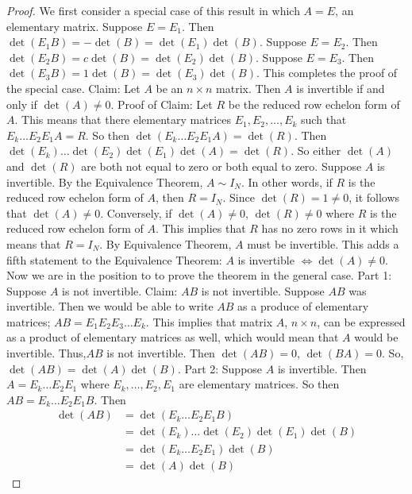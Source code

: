 \documentclass[12pt]{article}
\begin{document}
 \begin{proof} We first consider a special case of this result in which $A = E$, an elementary matrix. Suppose $E = E_1$. Then $\det(E_1B) = -\det(B) = \det(E_1)\det(B)$. Suppose $E = E_2$. Then $\det(E_2B) = c\det(B) = \det(E_2)\det(B)$. Suppose $E = E_3$. Then $\det(E_3B) = 1\det(B) = \det(E_3)\det(B)$. This completes the proof of the special case. \newline Claim: Let $A$ be an $n \times n$ matrix. Then $A$ is invertible if and only if $\det(A) \neq 0$. \newline Proof of Claim: Let $R$ be the reduced row echelon form of $A$. This means that there elementary matrices $E_1, E_2, \dots, E_k$ such that $E_k\dots E_2E_1A = R$. So then $\det(E_k \dots E_2E_1A) = \det(R)$. Then $\det(E_k)\dots \det(E_2)\det(E_1)\det(A) = \det(R)$. So either $\det(A)$ and $\det(R)$ are both not equal to zero or both equal to zero. Suppose $A$ is invertible. By the Equivalence Theorem, $A \sim I_N$. In other words, if $R$ is the reduced row echelon form of $A$, then $R = I_N$. Since $\det(R) = 1 \neq 0$, it follows that $\det(A) \neq 0$. \newline Conversely, if $\det(A) \neq 0$, $\det(R) \neq 0$ where $R$ is the reduced row echelon form of $A$. This implies that $R$ has no zero rows in it which means that $R = I_N$. By Equivalence Theorem, $A$ must be invertible. This adds a fifth statement to the Equivalence Theorem: $A$ is invertible $\iff \det(A) \neq 0$. Now we are in the position to to prove the theorem in the general case. \newline Part 1: Suppose $A$ is not invertible. \newline Claim: $AB$ is not invertible. \newline Suppose $AB$ was invertible. Then we would be able to write $AB$ as a produce of elementary matrices; $AB = E_1E_2E_3\dots E_k$. This implies that matrix $A$, $n \times n$, can be expressed as a product of elementary matrices as well, which would mean that $A$ would be invertible. Thus,$AB$ is not invertible. Then $\det(AB) = 0$, $\det(BA) = 0$. So, $\det(AB) = \det(A)\det(B)$. \newline Part 2: Suppose $A$ is invertible. Then $A = E_k\dots E_2E_1$ where $E_k, \dots, E_2, E_1$ are elementary matrices. So then $AB = E_k\dots E_2E_1B$. Then $$\begin{aligned} \det(AB) &= \det(E_k\dots E_2E_1B) \\ &= \det(E_k) \dots \det(E_2)\det(E_1)\det(B) \\ &= \det(E_k\dots E_2E_1)\det(B) \\ &= \det(A)\det(B) \end{aligned} $$ \end{proof} 
\end{document}
